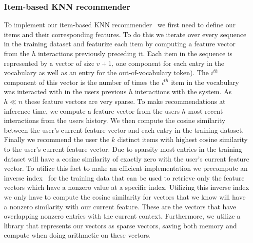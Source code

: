 \documentclass{article}
\begin{document}
\subsubsection{Item-based KNN recommender}
To implement our item-based KNN recommender~\cite{bahadorpour2017determining} we first need to define our items and their corresponding features. To do this we iterate over every sequence in the training dataset and featurize each item by computing a feature vector from the $h$ interactions previously preceding it. Each item in the sequence is represented by a vector of size $v + 1$, one component for each entry in the vocabulary as well as an entry for the out-of-vocabulary token). The $i^{th}$ component of this vector is the number of times the $i^{th}$ item in the vocabulary was interacted with in the users previous $h$ interactions with the system. As $h \ll n$ these feature vectors are very sparse. To make recommendations at inference time, we compute a feature vector from the users $h$ most recent interactions from the users history. We then compute the cosine similarity between the user's current feature vector and each entry in the training dataset. Finally we recommend the user the $k$ distinct items with highest cosine similarity to the user's current feature vector. Due to sparsity most entries in the training dataset will have a cosine similarity of exactly zero with the user's current feature vector. To utilize this fact to make an efficient implementation we precompute an inverse index~\cite{wang2010efficient} for the training data that can be used to retrieve only the feature vectors which have a nonzero value at a specific index. Utilizing this inverse index we only have to compute the cosine similarity for vectors that we know will have a nonzero similarity with our current feature. These are the vectors that have overlapping nonzero entries with the current context. Furthermore, we utilize a library that represents our vectors as sparse vectors, saving both memory and compute when doing arithmetic on these vectors.
\end{document}
